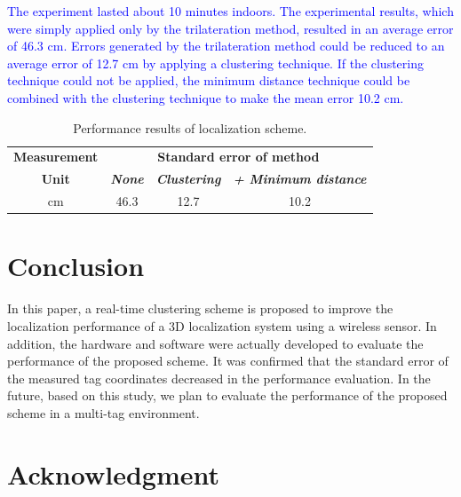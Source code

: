 \documentclass[conference]{IEEEtran}
\begin{document}
\textcolor{blue}{The experiment lasted about 10 minutes indoors. The experimental results, which were simply applied only by the trilateration method, resulted in an average error of 46.3 cm. Errors generated by the trilateration method could be reduced to an average error of 12.7 cm by applying a clustering technique. If the clustering technique could not be applied, the minimum distance technique could be combined with the clustering technique to make the mean error 10.2 cm.}

\begin{table}[htbp]
    \caption{Performance results of localization scheme.}
    \begin{center}
        \begin{tabular}{|c|c|c|c|}
            \hline
            \textbf{Measurement} & \multicolumn{3}{|c|}{\textbf{Standard error of method}}                                                                       \\
            \cline{2-4}
            \textbf{Unit}        & \textbf{\textit{None}}                                  & \textbf{\textit{Clustering}} & \textbf{\textit{+ Minimum distance}} \\
            \hline
            cm                   & 46.3                                                    & 12.7                         & 10.2                                 \\
            \hline
        \end{tabular}
        \label{tab1}
    \end{center}
\end{table}

\section{Conclusion}

In this paper, a real-time clustering scheme is proposed to improve the localization performance of a 3D localization system using a wireless sensor. In addition, the hardware and software were actually developed to evaluate the performance of the proposed scheme. It was confirmed that the standard error of the measured tag coordinates decreased in the performance evaluation. In the future, based on this study, we plan to evaluate the performance of the proposed scheme in a multi-tag environment.

\section*{Acknowledgment}
\end{document}
